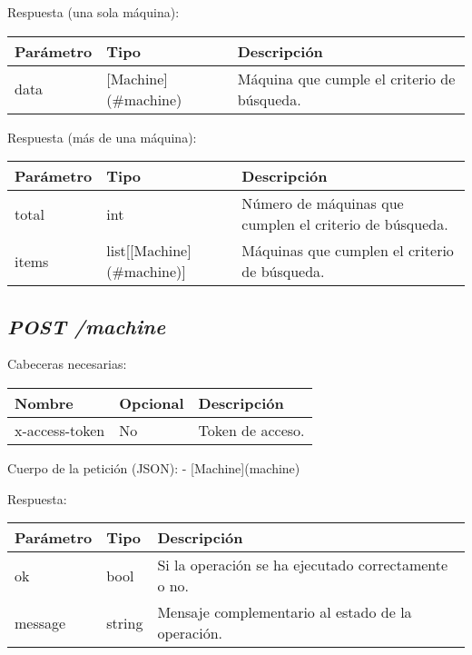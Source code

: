 Respuesta (una sola máquina):
\begin{table}[h!]
	\centering
	\begin{adjustbox}{max width=\textwidth}
	\begin{tabular}{|l|l|l|}
		\hline
		Parámetro & Tipo & Descripción \\ \hline
		data & [Machine](\#machine) & Máquina que cumple el criterio de búsqueda. \\ \hline
	\end{tabular}
\end{adjustbox}
\end{table}

Respuesta (más de una máquina):
\begin{table}[h!]
	\centering
	\begin{adjustbox}{max width=\textwidth}
	\begin{tabular}{|l|l|l|}
		\hline
		Parámetro & Tipo & Descripción \\ \hline
		total & int & Número de máquinas que cumplen el criterio de búsqueda. \\ \hline
		items & list[[Machine](\#machine)] & Máquinas que cumplen el criterio de búsqueda. \\ \hline
	\end{tabular}
\end{adjustbox}
\end{table}



\subsection{\textit{POST /machine}}

Cabeceras necesarias:
\begin{table}[h!]
	\centering
	\begin{adjustbox}{max width=\textwidth}
	\begin{tabular}{|l|l|l|}
		\hline
		Nombre & Opcional & Descripción \\ \hline
		x-access-token & No & Token de acceso. \\ \hline
	\end{tabular}
\end{adjustbox}
\end{table}

Cuerpo de la petición (JSON):
- [Machine](machine)

Respuesta:
\begin{table}[!h]
	\centering
	\begin{adjustbox}{max width=\textwidth}
	\begin{tabular}{|l|l|l|}
		\hline
		Parámetro & Tipo & Descripción \\ \hline
		ok & bool & Si la operación se ha ejecutado correctamente o no. \\ \hline
		message & string & Mensaje complementario al estado de la operación. \\ \hline
	\end{tabular}
\end{adjustbox}
\end{table}


